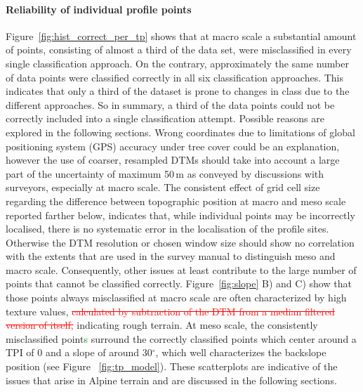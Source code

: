 \documentclass[preprint,12pt,authoryear]{elsarticle}
\begin{document}
\paragraph{Reliability of individual profile points} 
Figure~\ref{fig:hist_correct_per_tp} shows that at macro scale a substantial amount of points, consisting of almost a third of the data set, were misclassified in every single classification approach. On the contrary, approximately the same number of data points were classified correctly in all six classification approaches. This indicates that only a third of the dataset is prone to changes in class due to the different approaches. So in summary, a third of the data points could not be correctly included into a single classification attempt. Possible reasons are explored in the following sections. Wrong coordinates due to limitations of global positioning system (GPS) accuracy under tree cover could be an explanation, however the use of coarser, resampled DTMs should take into account a large part of the uncertainty of maximum 50\,m as conveyed by discussions with surveyors, especially at macro scale. The consistent effect of grid cell size regarding the difference between topographic position at macro and meso scale reported farther below, indicates that, while individual points may be incorrectly localised, there is no systematic error in the localisation of the profile sites. Otherwise the DTM resolution or chosen window size should show no correlation with the extents that are used in the survey manual to distinguish meso and macro scale. Consequently, other issues at least contribute to the large number of points that cannot be classified correctly. Figure~\ref{fig:slope} B) and C) show that those points always misclassified at macro scale are often characterized by high texture values, \textcolor{red}{\sout{calculated by subtraction of the DTM from a median filtered version of itself,}} indicating rough terrain. At meso scale, the consistently misclassified point\textcolor{green}{s} surround the correctly classified points which center around a TPI of 0 and a slope of around 30$^{\circ}$, which well characterizes the backslope position (see Figure~ \ref{fig:tp_model}). These scatterplots are indicative of the issues that arise in Alpine terrain and are discussed in the following sections.
\end{document}
